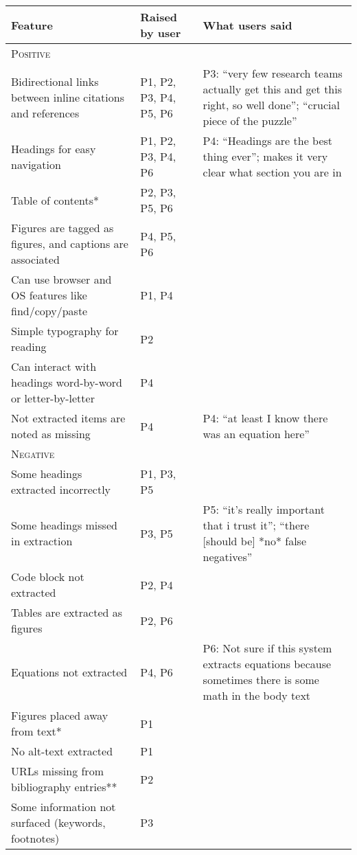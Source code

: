 \begin{table}[t!]
    \footnotesize
    \centering
    \begin{tabularx}{\linewidth}{llp{60mm}}
        \toprule
        \textbf{Feature} & \textbf{Raised by user} & \textbf{What users said} \\
        \midrule
        \textsc{Positive} & & \\
        \midrule
        Bidirectional links between inline citations and references & P1, P2, P3, P4, P5, P6 & P3: ``very few research teams actually get this and get this right, so well done''; ``crucial piece of the puzzle'' \\
        Headings for easy navigation & P1, P2, P3, P4, P6 & P4: ``Headings are the best thing ever''; makes it very clear what section you are in \\
        Table of contents* & P2, P3, P5, P6 & \\
        Figures are tagged as figures, and captions are associated & P4, P5, P6 & \\
        Can use browser and OS features like find/copy/paste  & P1, P4 & \\
        Simple typography for reading & P2 & \\
        Can interact with headings word-by-word or letter-by-letter & P4 & \\
        Not extracted items are noted as missing & P4 & P4: ``at least I know there was an equation here'' \\
        \midrule
        \textsc{Negative} & & \\
        \midrule
        Some headings extracted incorrectly & P1, P3, P5 & \\
        Some headings missed in extraction & P3, P5 & P5: ``it's really important that i trust it''; ``there [should be] *no* false negatives'' \\
        Code block not extracted & P2, P4 & \\
        Tables are extracted as figures & P2, P6 & \\
        Equations not extracted & P4, P6 & P6: Not sure if this system extracts equations because sometimes there is some math in the body text \\
        Figures placed away from text* & P1 & \\
        No alt-text extracted & P1 & \\
        URLs missing from bibliography entries** & P2 & \\
        Some information not surfaced (keywords, footnotes) & P3 & \\

\end{tabularx}
\end{table}
